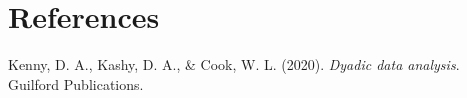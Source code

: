 \documentclass[
  man,floatsintext]{apa6}
\newlength{\cslhangindent}
\newlength{\cslentryspacingunit} %
\newenvironment{CSLReferences}[2] %
 {%
  \setlength{\parindent}{0pt}
  \ifodd #1
  \let\oldpar\par
  \def\par{\hangindent=\cslhangindent\oldpar}
  \fi
  \setlength{\parskip}{#2\cslentryspacingunit}
 }%
 {}
\begin{document}
\hypertarget{references}{%
\section{References}\label{references}}

\hypertarget{refs}{}
\begin{CSLReferences}{1}{0}
\leavevmode{}%
Kenny, D. A., Kashy, D. A., \& Cook, W. L. (2020). \emph{Dyadic data analysis}. Guilford Publications.

\end{CSLReferences}


\clearpage
\renewcommand{\listfigurename}{Figure captions}

\clearpage
\renewcommand{\listtablename}{Table captions}
\end{document}
